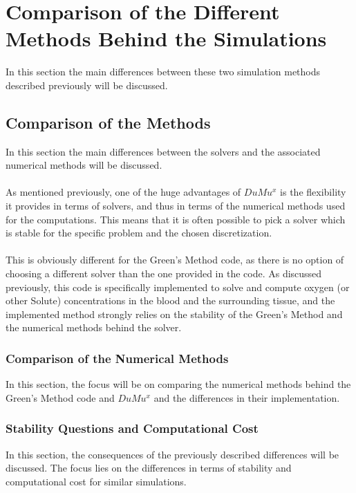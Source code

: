 \section{Comparison of the Different Methods Behind the Simulations}
In this section the main differences between these two simulation methods described previously will be discussed.

\subsection{Comparison of the Methods}
In this section the main differences between the solvers and the associated numerical methods will be discussed.
\\
\\As mentioned previously, one of the huge advantages of $DuMu^x$ is the flexibility it provides in terms of solvers, and thus in terms of the numerical methods used for the computations. This means that it is often possible to pick a solver which is stable for the specific problem and the chosen discretization.
\\
\\This is obviously different for the Green's Method code, as there is no option of choosing a different solver than the one provided in the code. As discussed previously, this code is specifically implemented to solve and compute oxygen (or other Solute) concentrations in the blood and the surrounding tissue, and the implemented method strongly relies on the stability of the Green's Method and the numerical methods behind the solver.

\subsubsection{Comparison of the Numerical Methods}
In this section, the focus will be on comparing the numerical methods behind the Green's Method code and $DuMu^x$ and the differences in their implementation.

\subsubsection{Stability Questions and Computational Cost}
In this section, the consequences of the previously described differences will be discussed. The focus lies on the differences in terms of stability and computational cost for similar simulations.


